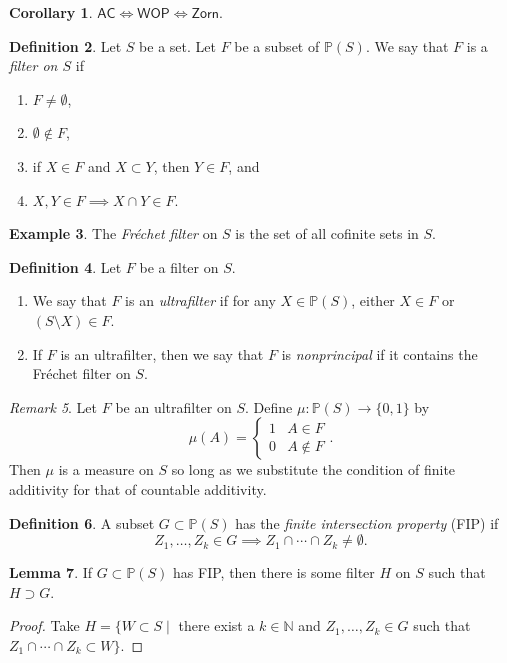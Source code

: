 \documentclass[10pt,letterpaper,cm]{nupset}
\theoremstyle{definition}
\newtheorem{definition}{Definition}[subsection]
\newtheorem{exmp}[definition]{Example}
\theoremstyle{theorem}
\newtheorem{lemma}[definition]{Lemma}
\newtheorem{corollary}[definition]{Corollary}
\theoremstyle{remark}
\newtheorem{remark}[definition]{Remark}
\newcommand{\N}{\mathbb N}
\renewcommand{\P}{\mathbb P}
\newcommand{\1}{\mathbf{1}}
\newcommand{\0}{\vec 0}
\newcommand{\ac}{\mathsf{AC}}
\begin{document}
\begin{corollary}
$\ac \iff \mathsf{WOP} \iff \mathsf{Zorn}$.
\end{corollary}

\begin{definition} Let $S$ be a set. Let $F$ be a subset of $\P(S)$. We say that $F$  is a \textit{filter on $S$} if
\begin{enumerate}[label=(\roman*)]
\item $F\ne \emptyset$,
\item $\emptyset \notin F$,
\item if $X \in F$ and $X \subset Y$, then $Y \in F$, and
\item $X,Y \in F \implies X \cap Y \in F$.
\end{enumerate}
\end{definition}

\begin{exmp}
The \textit{Fr\'echet filter} on $S$ is the set of all cofinite sets in $S$.
\end{exmp}

\begin{definition}  Let $F$ be a filter on $S$.
\begin{enumerate}
\item We say that $F$ is an \textit{ultrafilter} if for any $X \in \P(S)$, either $X \in F$ or $(S \setminus X) \in F$.
\item If $F$ is an ultrafilter, then we say that $F$ is \textit{nonprincipal} if it contains the Fr\'echet filter on $S$.
\end{enumerate} 
\end{definition}

\begin{remark}
Let $F$ be an ultrafilter on $S$. Define $\mu : \P(S) \to \{0,1\}$ by $$\mu(A) =\begin{cases} 1 & A \in F \\ 0 & A \notin F \end{cases} .$$ Then $\mu$ is a measure on $S$ so long as we substitute the condition of finite additivity for that of countable additivity.    
\end{remark}

\begin{definition}
A subset $G\subset \P(S)$ has the \textit{finite intersection property} (FIP) if $$Z_1, \ldots, Z_k \in G \implies Z_1 \cap \cdots \cap Z_k \ne \emptyset.$$
\end{definition}

\begin{lemma}
If $G\subset \P(S)$ has FIP, then there is some filter $H$ on $S$ such that $H\supset G$.
\end{lemma}
\begin{proof}
Take $H = \{W\subset S \mid$ there exist a $k\in \N$ and $Z_1, \ldots, Z_k \in G$ such that $Z_1 \cap \cdots \cap Z_k \subset W\}$.
\end{proof}
\end{document}
